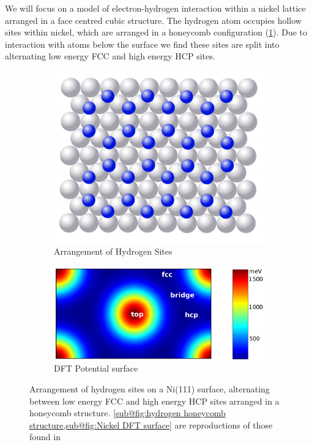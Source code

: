 We will
focus on a model of
electron-hydrogen
interaction within
a nickel lattice arranged
in a
face centred cubic structure.
The hydrogen atom
occupies hollow sites
within nickel\cite{doi:10.1063/1.522979},
which are arranged in a
honeycomb configuration
(\cref{sub@fig:hydrogen honeycomb structure}).
Due to interaction with
atoms below the surface
we find these sites are split
into alternating low energy
FCC and high energy HCP
sites\cite{Jianding-Zhu}.
\begin{figure}[htbp]
    \centering
    \begin{subfigure}{0.45\linewidth}
        \centering
        \includegraphics[width =0.9 \linewidth]{Figures/Model/Hydrogen sites.png}
        \caption{Arrangement of Hydrogen Sites
        }\label{sub@fig:hydrogen honeycomb structure}
    \end{subfigure}
    \begin{subfigure}{0.45\linewidth}
        \centering
        \includegraphics[width = 0.9\linewidth]{Figures/Model/Hydrogen DFT Potential.png}
        \caption{DFT Potential surface
        }\label{sub@fig:Nickel DFT surface}
    \end{subfigure}
    \caption{
        Arrangement of hydrogen
        sites on a Ni(111) surface,%
        alternating
        between low energy FCC and
        high energy HCP sites arranged
        in a honeycomb structure.
        \cref{sub@fig:hydrogen honeycomb structure,sub@fig:Nickel DFT surface}
        are reproductions of those found in\cite{Jianding-Zhu}
    }
\end{figure}
